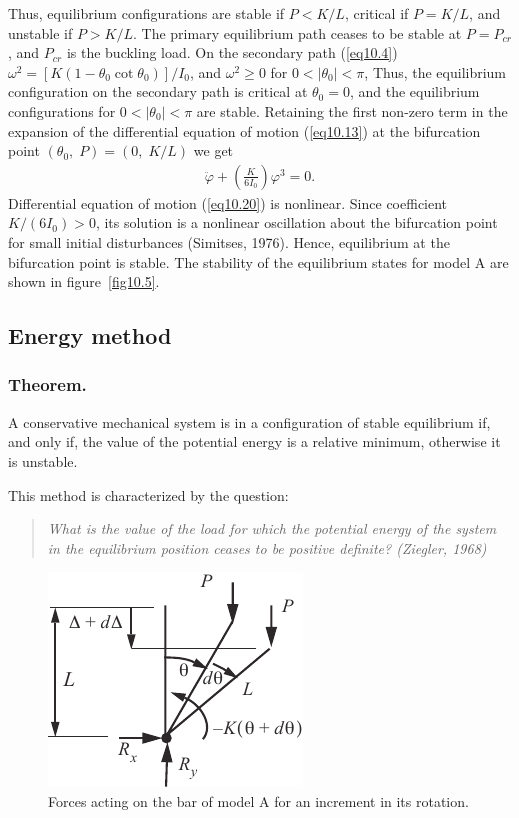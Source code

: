 \documentclass{AeroStructure-ERJohnson}
\begin{document}
\noindent Thus, equilibrium configurations are stable if $P<K / L$, critical if $P=K / L$, and unstable if $P>K / L$. The primary equilibrium path ceases to be stable at $P=P_{c r}$, and $P_{c r}$ is the buckling load. On the secondary path (\ref{eq10.4}) $\omega^{2}=\left[K\left(1-\theta_{0} \cot \theta_{0}\right)\right] / I_{0}$, and $\omega^{2} \geq 0$ for $0<\left|\theta_{0}\right|<\pi$, Thus, the equilibrium configuration on the secondary path is critical at $\theta_{0}=0$, and the equilibrium configurations for $0<\left|\theta_{0}\right|<\pi$ are stable. Retaining the first non-zero term in the expansion of the differential equation of motion (\ref{eq10.13}) at the bifurcation point $\left(\theta_{0},\; P\right)=(0,\; K / L)$ we get
\begin{align}\label{eq10.20}
\ddot{\varphi}+\left(\frac{K}{6 I_{0}}\right) \varphi^{3}=0.
\end{align}
Differential equation of motion (\ref{eq10.20}) is nonlinear. Since coefficient $K /\left(6 I_{0}\right)>0$, its solution is a nonlinear oscillation about the bifurcation point for small initial disturbances (Simitses, 1976). Hence, equilibrium at the bifurcation point is stable. The stability of the equilibrium states for model A are shown in figure~\ref{fig10.5}.


\subsection{Energy method}\label{sec10.1.3}

\subsubsection{Theorem.} A conservative mechanical system is in a configuration of stable equilibrium if, and only if, the value of the potential energy is a relative minimum, otherwise it is unstable.

This method is characterized by the question:

\begin{quote}
\textit{What is the value of the load for which the potential energy of the system in the equilibrium position ceases to be positive definite? (Ziegler, 1968)}
\end{quote}
\begin{figure}
\includegraphics{Figure_10-6.pdf}
\caption{Forces acting on the bar of model A for an increment in its
rotation.\label{fig10.6}}
\end{figure}
\end{document}
